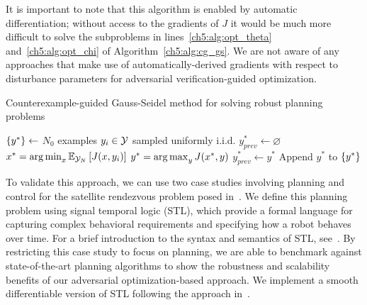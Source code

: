 It is important to note that this algorithm is enabled by automatic differentiation; without access to the gradients of $J$ it would be much more difficult to solve the subproblems in lines~\ref{ch5:alg:opt_theta} and~\ref{ch5:alg:opt_chi} of Algorithm~\ref{ch5:alg:cg_gs}. We are not aware of any approaches that make use of automatically-derived gradients with respect to disturbance parameters for adversarial verification-guided optimization.

\begin{algorithm}
    \caption{Counterexample-guided Gauss-Seidel method for solving robust planning problems}\label{ch5:alg:cg_gs}
    \DontPrintSemicolon
    $\left\{y^*\right\} \gets $ $N_0$ examples $y_i \in \mathcal{Y}$ sampled uniformly i.i.d.\;
    $y^*_{prev} \gets \varnothing$\;
    {
        $x^* = \operatorname*{arg\,min}_x \mathbb{E}_{\mathcal{Y}_N} \left[ J(x, y_i) \right] \label{ch5:alg:opt_theta}$ \;
        $y^* = \operatorname*{arg\,max}_y J(x^*, y)$ \label{ch5:alg:opt_chi} \;
        $y^*_{prev} \gets y^*$\;
        Append $y^*$ to $\left\{y^*\right\}$\;
    }
\end{algorithm}

To validate this approach, we can use two case studies involving planning and control for the satellite rendezvous problem posed in~\cite{jewisonSpacecraftBenchmarkProblem2016}. We define this planning problem using signal temporal logic (STL), which provide a formal language for capturing complex behavioral requirements and specifying how a robot behaves over time. For a brief introduction to the syntax and semantics of STL, see~\cite{dawsonRobustCounterexampleguidedOptimization2022}. By restricting this case study to focus on planning, we are able to benchmark against state-of-the-art planning algorithms to show the robustness and scalability benefits of our adversarial optimization-based approach. We implement a smooth differentiable version of STL following the approach in~\cite{leungBackPropagationSignalTemporal2021,pantSmoothOperatorControl2017}.

